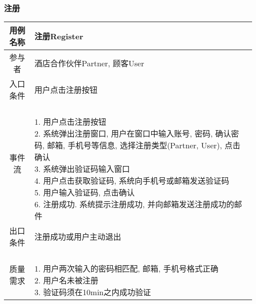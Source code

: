 \documentclass[11pt]{article}
\begin{document}
		\subsubsection{注册}
			\begin{tabular}{c|l}
			\hline
			用例名称 & 注册Register \\ \hline
			参与者 & 酒店合作伙伴Partner, 顾客User  \\ \hline
			入口条件 & 用户点击注册按钮 \\ \hline
			事件流 & 	\parbox{33em}{\ \\
						1. 用户点击注册按钮 \\
						2. 系统弹出注册窗口, 用户在窗口中输入账号, 密码, 确认密码, 邮箱, 手机号等信息, 选择注册类型(Partner, User), 点击确认  \\
						3. 系统弹出验证码输入窗口 \\
						4. 用户点击获取验证码, 系统向手机号或邮箱发送验证码 \\
						5. 用户输入验证码, 点击确认 \\
						6. 注册成功. 系统提示注册成功, 并向邮箱发送注册成功的邮件 \\
						} \\ \hline
			出口条件 & 注册成功或用户主动退出 \\ \hline
			质量需求 & \parbox{33em}{\ \\
						1. 用户两次输入的密码相匹配, 邮箱, 手机号格式正确 \\ 
						2. 用户名未被注册 \\
						3. 验证码须在10min之内成功验证 \\
						} \\ \hline
			\end{tabular}
\end{document}
